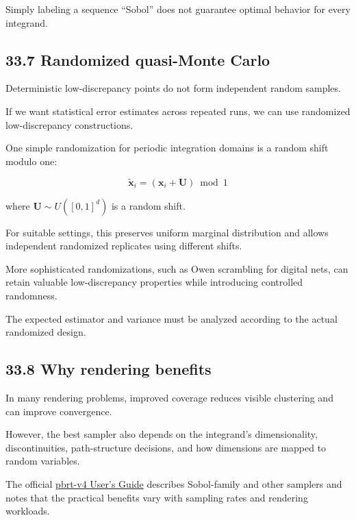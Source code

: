 Simply labeling a sequence ``Sobol'' does not guarantee optimal behavior for every integrand.

\subsection{33.7 Randomized quasi-Monte Carlo}\label{02-foundations-ii-ch031-randomized-quasi-monte-carlo}

\hypertarget{02-foundations-ii-ch031-randomized-quasi-monte-carlo}{}

Deterministic low-discrepancy points do not form independent random samples.

If we want statistical error estimates across repeated runs, we can use randomized low-discrepancy constructions.

One simple randomization for periodic integration domains is a random shift modulo one:

\[ \boxed{ \tilde{\mathbf x}_i = (\mathbf x_i+\mathbf U)\bmod1 } \]

where \(\mathbf U\sim U([0,1]^d)\) is a random shift.

For suitable settings, this preserves uniform marginal distribution and allows independent randomized replicates using different shifts.

More sophisticated randomizations, such as Owen scrambling for digital nets, can retain valuable low-discrepancy properties while introducing controlled randomness.

The expected estimator and variance must be analyzed according to the actual randomized design.

\subsection{33.8 Why rendering benefits}\label{02-foundations-ii-ch031-why-rendering-benefits}

\hypertarget{02-foundations-ii-ch031-why-rendering-benefits}{}

In many rendering problems, improved coverage reduces visible clustering and can improve convergence.

However, the best sampler also depends on the integrand's dimensionality, discontinuities, path-structure decisions, and how dimensions are mapped to random variables.

The official \href{https://www.pbrt.org/users-guide-v4?utm_source=chatgpt.com}{pbrt-v4 User's Guide} describes Sobol-family and other samplers and notes that the practical benefits vary with sampling rates and rendering workloads. 

